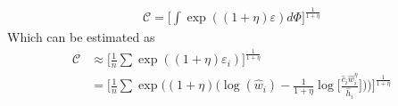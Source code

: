 \documentclass{article}
\begin{document}
\begin{enumerate}
\begin{itemize}
\begin{align*}
\mathcal{C} = \Bigg[\int \exp((1 + \eta)\varepsilon)d\Phi \Bigg]^{\frac{1}{1+\eta}}
\end{align*}
Which can be estimated as
\begin{align*}
\mathcal{C} 
&\approx \Bigg[ \frac{1}{n} \sum \exp((1 + \eta)\varepsilon_i) \Bigg]^{\frac{1}{1+\eta}}\\
&= \Bigg[ \frac{1}{n} \sum \exp\Bigg((1 + \eta) \Bigg( \log (\hat w_i) - \frac{1}{1+\eta} \log\Bigg[\frac{\hat c_i \hat w_i^\eta}{\hat h_i}\Bigg] \Bigg) \Bigg) \Bigg]^{\frac{1}{1+\eta}}
\end{align*}


\end{itemize}

\end{enumerate}
\end{document}
